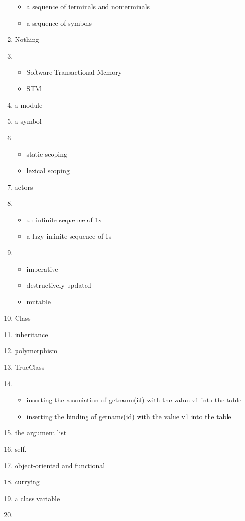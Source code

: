 \documentclass{exam}
\begin{document}
\begin{enumerate}
\begin{itemize}
\item a sequence of terminals and nonterminals
\item a sequence of symbols
\end{itemize}
\item Nothing
\item \begin{itemize}
\item Software Transactional Memory
\item STM
\end{itemize}
\item a module
\item a symbol
\item \begin{itemize}
\item static scoping
\item lexical scoping
\end{itemize}
\item actors
\item \begin{itemize}
\item an infinite sequence of 1s
\item a lazy infinite sequence of 1s
\end{itemize}
\item \begin{itemize}
\item imperative
\item destructively updated
\item mutable
\end{itemize}
\item Class
\item inheritance
\item polymorphism
\item TrueClass
\item \begin{itemize}
\item inserting the association of getname(id) with the value v1 into the table
\item inserting the binding of getname(id) with the value v1 into the table
\end{itemize}
\item the argument list
\item self.
\item object-oriented and functional
\item currying
\item a class variable
\item \begin{itemize}

\end{itemize}
\end{enumerate}
\end{document}
